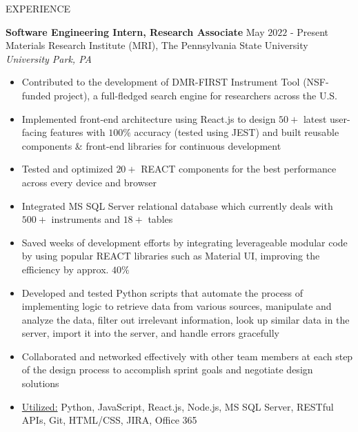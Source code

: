 \documentclass{resume} %
\begin{document}
\begin{rSection}{EXPERIENCE}

\textbf{Software Engineering Intern, Research Associate} \hfill May $2022$ - Present\\
Materials Research Institute (MRI), The Pennsylvania State University \hfill \textit{University Park, PA}
 \begin{itemize}
    \itemsep -3pt {}
     \item Contributed to the development of DMR-FIRST Instrument Tool (NSF-funded project), a full-fledged search engine for researchers across the U.S.
     \item Implemented front-end architecture using React.js to design $50+$ latest user-facing features with $100\%$ accuracy (tested using JEST) and built reusable components \& front-end libraries for continuous development
     \item Tested and optimized $20+$ REACT components for the best performance across every device and browser
     \item Integrated MS SQL Server relational database which currently deals with $500+$ instruments and $18+$ tables
     \item Saved weeks of development efforts by integrating leverageable modular code by using popular REACT libraries such as Material UI, improving the efficiency by approx. $40\%$
     \item Developed and tested Python scripts that automate the process of implementing logic to retrieve data from various sources, manipulate and analyze the data, filter out irrelevant information, look up similar data in the server, import it into the server, and handle errors gracefully
     \item Collaborated and networked effectively with other team members at each step of the design process to accomplish sprint goals and negotiate design solutions 
     \item \underline{Utilized:} Python, JavaScript, React.js, Node.js, MS SQL Server, RESTful APIs, Git, HTML/CSS, JIRA, Office 365
    \end{itemize}

\end{rSection} 


\end{document}
